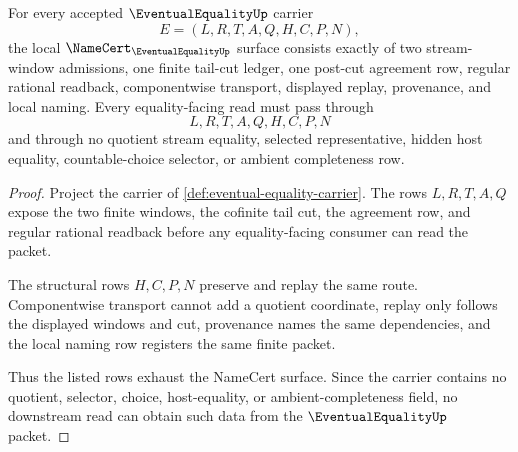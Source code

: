 \begin{theorem}
\label{thm:eventual-equality-namecert-obligations}
For every accepted $\EventualEqualityUp$ carrier
$$
E=(L,R,T,A,Q,H,C,P,N),
$$
the local $\NameCert_{\EventualEqualityUp}$ surface consists exactly of two stream-window admissions, one finite tail-cut ledger, one post-cut agreement row, regular rational readback, componentwise transport, displayed replay, provenance, and local naming. Every equality-facing read must pass through
$$
L,R,T,A,Q,H,C,P,N
$$
and through no quotient stream equality, selected representative, hidden host equality, countable-choice selector, or ambient completeness row.
\end{theorem}
\begin{proof}
Project the carrier of \autoref{def:eventual-equality-carrier}. The rows $L,R,T,A,Q$ expose the two finite windows, the cofinite tail cut, the agreement row, and regular rational readback before any equality-facing consumer can read the packet.

The structural rows $H,C,P,N$ preserve and replay the same route. Componentwise transport cannot add a quotient coordinate, replay only follows the displayed windows and cut, provenance names the same dependencies, and the local naming row registers the same finite packet.

Thus the listed rows exhaust the NameCert surface. Since the carrier contains no quotient, selector, choice, host-equality, or ambient-completeness field, no downstream read can obtain such data from the $\EventualEqualityUp$ packet.
\end{proof}

